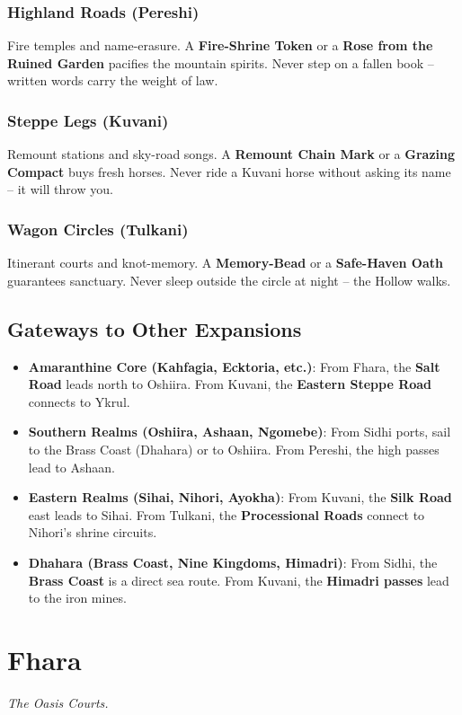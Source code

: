 \documentclass[12pt,oneside]{book}
\begin{document}
\subsection*{Highland Roads (Pereshi)}
Fire temples and name-erasure. A \textbf{Fire-Shrine Token} or a \textbf{Rose from the Ruined Garden} pacifies the mountain spirits. Never step on a fallen book -- written words carry the weight of law.

\subsection*{Steppe Legs (Kuvani)}
Remount stations and sky-road songs. A \textbf{Remount Chain Mark} or a \textbf{Grazing Compact} buys fresh horses. Never ride a Kuvani horse without asking its name -- it will throw you.

\subsection*{Wagon Circles (Tulkani)}
Itinerant courts and knot-memory. A \textbf{Memory-Bead} or a \textbf{Safe-Haven Oath} guarantees sanctuary. Never sleep outside the circle at night -- the Hollow walks.

\section*{Gateways to Other Expansions}

\begin{itemize}
  \item \textbf{Amaranthine Core (Kahfagia, Ecktoria, etc.)}: From Fhara, the \textbf{Salt Road} leads north to Oshiira. From Kuvani, the \textbf{Eastern Steppe Road} connects to Ykrul.
  \item \textbf{Southern Realms (Oshiira, Ashaan, Ngomebe)}: From Sidhi ports, sail to the Brass Coast (Dhahara) or to Oshiira. From Pereshi, the high passes lead to Ashaan.
  \item \textbf{Eastern Realms (Sihai, Nihori, Ayokha)}: From Kuvani, the \textbf{Silk Road} east leads to Sihai. From Tulkani, the \textbf{Processional Roads} connect to Nihori's shrine circuits.
  \item \textbf{Dhahara (Brass Coast, Nine Kingdoms, Himadri)}: From Sidhi, the \textbf{Brass Coast} is a direct sea route. From Kuvani, the \textbf{Himadri passes} lead to the iron mines.
\end{itemize}
\newpage
\chapter{Fhara}
\emph{The Oasis Courts.}
\end{document}
